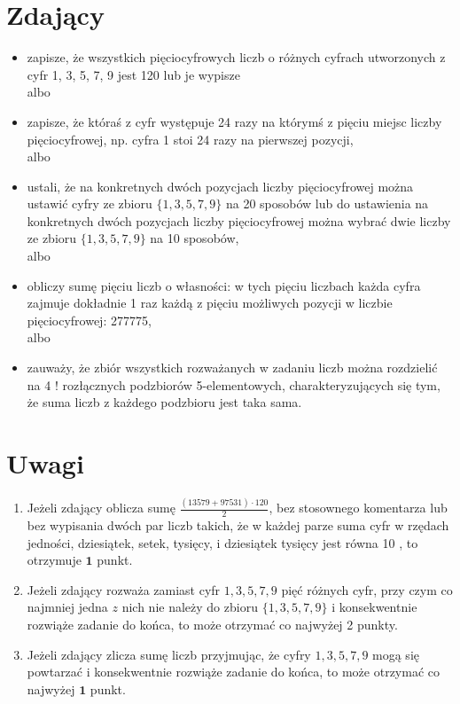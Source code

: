 \documentclass[10pt]{article}
\begin{document}
\section*{Zdający}
\begin{itemize}
  \item zapisze, że wszystkich pięciocyfrowych liczb o różnych cyfrach utworzonych z cyfr 1, 3, 5, 7, 9 jest 120 lub je wypisze\\
albo
  \item zapisze, że któraś z cyfr występuje 24 razy na którymś z pięciu miejsc liczby pięciocyfrowej, np. cyfra 1 stoi 24 razy na pierwszej pozycji,\\
albo
  \item ustali, że na konkretnych dwóch pozycjach liczby pięciocyfrowej można ustawić cyfry ze zbioru $\{1,3,5,7,9\}$ na 20 sposobów lub do ustawienia na konkretnych dwóch pozycjach liczby pięciocyfrowej można wybrać dwie liczby ze zbioru $\{1,3,5,7,9\}$ na 10 sposobów,\\
albo
  \item obliczy sumę pięciu liczb o własności: w tych pięciu liczbach każda cyfra zajmuje dokładnie 1 raz każdą z pięciu możliwych pozycji w liczbie pięciocyfrowej: 277775,\\
albo
  \item zauważy, że zbiór wszystkich rozważanych w zadaniu liczb można rozdzielić na 4 ! rozłącznych podzbiorów 5-elementowych, charakteryzujących się tym, że suma liczb z każdego podzbioru jest taka sama.
\end{itemize}

\section*{Uwagi}
\begin{enumerate}
  \item Jeżeli zdający oblicza sumę $\frac{(13579+97531) \cdot 120}{2}$, bez stosownego komentarza lub bez wypisania dwóch par liczb takich, że w każdej parze suma cyfr w rzędach jedności, dziesiątek, setek, tysięcy, i dziesiątek tysięcy jest równa 10 , to otrzymuje $\mathbf{1}$ punkt.
  \item Jeżeli zdający rozważa zamiast cyfr $1,3,5,7,9$ pięć różnych cyfr, przy czym co najmniej jedna $z$ nich nie należy do zbioru $\{1,3,5,7,9\}$ i konsekwentnie rozwiąże zadanie do końca, to może otrzymać co najwyżej 2 punkty.
  \item Jeżeli zdający zlicza sumę liczb przyjmując, że cyfry $1,3,5,7,9$ mogą się powtarzać i konsekwentnie rozwiąże zadanie do końca, to może otrzymać co najwyżej $\mathbf{1}$ punkt.
\end{enumerate}
\end{document}
